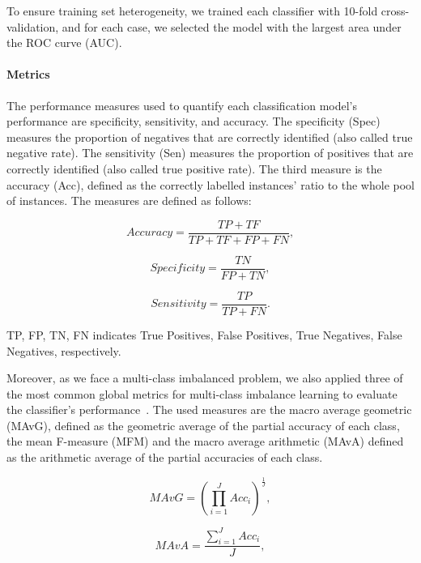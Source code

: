 \documentclass[twocolumn]{svjour3}           %
\begin{document}
To ensure training set heterogeneity, we trained each classifier with 10-fold cross-validation, and for each case, we selected the model with the largest area under the ROC curve (AUC). 

\paragraph{Metrics}
\label{par:metrics}
The performance measures used to quantify each classification model's performance are specificity, sensitivity, and accuracy. 
The specificity (Spec) measures the proportion of negatives that are correctly identified (also called true negative rate). The sensitivity (Sen) measures the proportion of positives that are correctly identified (also called true positive rate).
The third measure is the accuracy (Acc), defined as the correctly labelled instances' ratio to the whole pool of instances. 
The measures are defined as follows:

\begin{equation}
	Accuracy = \frac{TP+TF}{TP+TF+FP+FN} ,
\end{equation} 

\begin{equation}
	Specificity = \frac{TN}{FP+TN} ,
\end{equation}

\begin{equation}
	Sensitivity = \frac{TP}{TP+FN} .
\end{equation}

TP, FP, TN, FN indicates True Positives, False Positives, True Negatives, False Negatives, respectively.

Moreover, as we face a multi-class imbalanced problem, we also applied three of the most common global metrics for multi-class imbalance learning to evaluate the classifier's performance~\cite{Alejo2013}. The used measures are the macro average geometric (MAvG), defined as the geometric average of the partial accuracy of each class, the mean F-measure (MFM) and the macro average arithmetic (MAvA) defined as the arithmetic average of the partial accuracies of each class. 

\begin{equation}
	MAvG = (\prod_{i=1}^J Acc_i)^{\frac{1}{J}} ,
\end{equation}

\begin{equation}
	MAvA = \frac{\sum_{i=1}^J Acc_i}{J} ,
\end{equation}
\end{document}
